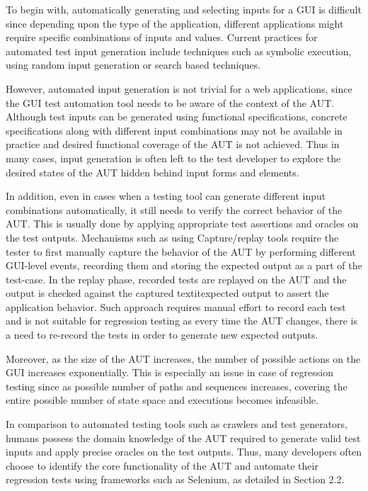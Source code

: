 To begin with, automatically generating and selecting inputs for a GUI is difficult since depending upon the type of the application, different applications might require specific combinations of inputs and values. 
Current practices for automated test input generation include techniques such as symbolic execution\cite{Ganovetal}, using random input generation\cite{godefroid2005dart} or search based techniques\cite{gross2012search}.

However, automated input generation is not trivial for a web applications, since the GUI test automation tool needs to be aware of the context of the AUT. Although test inputs can be generated using functional specifications, concrete specifications along with different input combinations may not be available in practice and desired functional coverage of the AUT is not achieved. Thus in many cases, input generation is often left to the test developer to explore the desired states of the AUT hidden behind input forms and elements.

In addition, even in cases when a testing tool can generate different input combinations automatically, it still needs to verify the correct behavior of the AUT. This is usually done by applying appropriate test assertions and oracles on the test outputs\cite{Baresi:Oracles}. Mechanisms such as using Capture/replay tools\cite{joshi2006capture} require the tester to first manually capture the behavior of the AUT by performing different GUI-level events, recording them and storing the expected output as a part of the test-case. In the replay phase, recorded tests are replayed on the AUT and the output is checked against the captured textit{expected output} to assert the application behavior. Such approach requires manual effort to record each test and is not suitable for regression testing as every time the AUT changes\cite{sjosten2006costs}, there is a need to re-record the tests in order to generate new expected outputs. 

Moreover, as the size of the AUT increases, the number of possible actions on the GUI increases exponentially. This is especially an issue in case of regression testing since as possible number of paths and sequences increases, covering the entire possible number of state space and executions becomes infeasible.

In comparison to automated testing tools such as crawlers and test generators, humans possess the domain knowledge of the AUT required to generate valid test inputs and apply precise oracles on the test outputs. Thus, many developers often choose to identify the core functionality of the AUT and automate their regression tests using frameworks such as Selenium\cite{websiteSelenium}, as detailed in Section 2.2.


